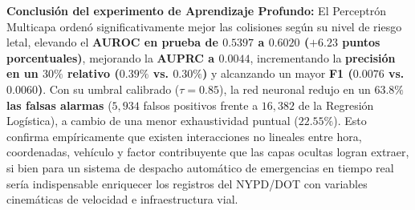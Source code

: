 \noindent \textbf{Conclusión del experimento de Aprendizaje Profundo:}
El Perceptrón Multicapa ordenó significativamente mejor las colisiones según su nivel de riesgo letal, elevando el \textbf{AUROC en prueba de $0.5397$ a $0.6020$ ($+6.23$ puntos porcentuales)}, mejorando la \textbf{AUPRC a $0.0044$}, incrementando la \textbf{precisión en un $30\%$ relativo ($0.39\%$ vs. $0.30\%$)} y alcanzando un mayor \textbf{F1 ($0.0076$ vs. $0.0060$)}. Con su umbral calibrado ($\tau = 0.85$), la red neuronal redujo en un \textbf{$63.8\%$ las falsas alarmas} ($5,934$ falsos positivos frente a $16,382$ de la Regresión Logística), a cambio de una menor exhaustividad puntual ($22.55\%$). Esto confirma empíricamente que existen interacciones no lineales entre hora, coordenadas, vehículo y factor contribuyente que las capas ocultas logran extraer, si bien para un sistema de despacho automático de emergencias en tiempo real sería indispensable enriquecer los registros del NYPD/DOT con variables cinemáticas de velocidad e infraestructura vial.
